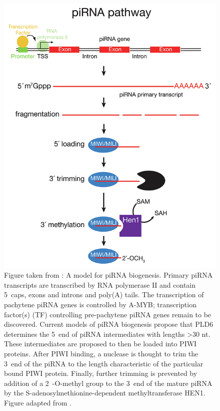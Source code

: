     \begin{figure}\small %
     \centering 
     \includegraphics{Figures/Intro/mammalian_piRNA_pathway.png}
     \caption[A model for Mammalian piRNA biogenesis]
     {
       Figure taken from \citep{Li2013e}: A model for piRNA biogenesis. Primary piRNA transcripts are transcribed by RNA polymerase II and contain 5\textprime~caps, exons and introns and poly(A) tails. The transcription of pachytene piRNA genes is controlled by A-MYB; transcription factor(s) (TF) controlling pre-pachytene piRNA genes remain to be discovered. Current models of piRNA biogenesis propose that PLD6 determines the 5\textprime~end of piRNA intermediates with lengths >30 nt. These intermediates are proposed to then be loaded into PIWI proteins. After PIWI binding, a nuclease is thought to trim the 3\textprime~end of the piRNA to the length characteristic of the particular bound PIWI protein. Finally, further trimming is prevented by addition of a 2\textprime~-O-methyl group to the 3\textprime~end of the mature piRNA by the S-adenosylmethionine-dependent methyltransferase HEN1. Figure adapted from \citep{Li2013}.
       }
     \label{Intro:fig:Mammalian piRNA BioGensis}
     \end{figure}

